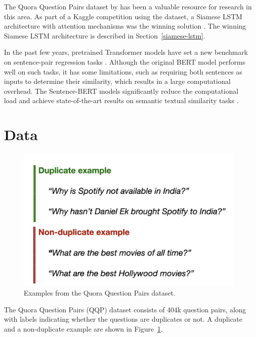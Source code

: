 \documentclass[10pt, a4paper]{article}
\begin{document}
The Quora Question Pairs dataset by \citet{iyer2017first} has been a valuable resource for research in this area.
As part of a Kaggle competition using the dataset, a Siamese LSTM architecture with attention mechanisms was the winning solution \citep{dadashov2017quora}.
The winning Siamese LSTM architecture is described in Section~\ref{siamese-lstm}.

In the past few years, pretrained Transformer models have set a new benchmark on sentence-pair regression tasks \citep{devlin2018bert}.
Although the original BERT model performs well on such tasks, it has some limitations, such as requiring both sentences as inputs to determine their similarity, which results in a large computational overhead.
The Sentence-BERT models significantly reduce the computational load and achieve state-of-the-art results on semantic textual similarity tasks \citep{reimers-2019-sentence-bert}.

\section{Data} \label{dataset}

\begin{figure}
\begin{center}
\includegraphics[width=\columnwidth]{figures/dataset-examples.png}
\caption{Examples from the Quora Question Pairs dataset.}
\label{fig:duplicate-examples}
\end{center}
\end{figure}

The Quora Question Pairs (QQP) dataset consists of 404k question pairs, along with labels indicating whether the questions are duplicates or not.
A duplicate and a non-duplicate example are shown in Figure~\ref{fig:duplicate-examples}.
\end{document}
